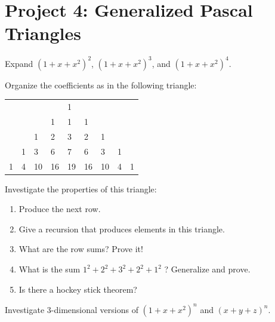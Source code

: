 \documentclass[10pt,]{book}
\theoremstyle{plain}
\theoremstyle{definition}
\theoremstyle{definition}
\theoremstyle{definition}
\theoremstyle{definition}
\numberwithin{equation}{chapter}
\begin{document}
\section[{Project 4: Generalized Pascal Triangles}]{Project 4: Generalized Pascal Triangles}\label{exercises-14}
\begin{divisionexercise}{1}\hypertarget{exercise-148}{}
\hypertarget{p-1204}{}%
Expand \({\left( 1 + x + x^{2} \right)}^{2}\), \(\left( 1 + x + x^{2} \right)^{3}\), and \(\left( 1 + x + x^{2} \right)^{4}\).%
\end{divisionexercise}%
\begin{divisionexercise}{2}\hypertarget{exercise-149}{}
\hypertarget{p-1205}{}%
Organize the coefficients as in the following triangle:%
\begin{sidebyside}{1}{0.1}{0.1}{0}
\begin{sbspanel}{0.8}
{\centering%
\begin{tabular}{lllllllll}
&&&&1&&&&\tabularnewline[0pt]
&&&1&1&1&&&\tabularnewline[0pt]
&&1&2&3&2&1&&\tabularnewline[0pt]
&1&3&6&7&6&3&1&\tabularnewline[0pt]
1&4&10&16&19&16&10&4&1
\end{tabular}
\par}
\end{sbspanel}
\end{sidebyside}
\end{divisionexercise}%
\begin{divisionexercise}{3}\hypertarget{exercise-150}{}
\hypertarget{p-1206}{}%
Investigate the properties of this triangle: \leavevmode%
\begin{enumerate}[label=(\alph*)]
\item\hypertarget{li-260}{}\hypertarget{p-1207}{}%
Produce the next row.%
\item\hypertarget{li-261}{}\hypertarget{p-1208}{}%
Give a recursion that produces elements in this triangle.%
\item\hypertarget{li-262}{}\hypertarget{p-1209}{}%
What are the row sums? Prove it!%
\item\hypertarget{li-263}{}\hypertarget{p-1210}{}%
What is the sum \(1^{2} + 2^{2} + 3^{2} + 2^{2} + 1^{2}\) ? Generalize and prove.%
\item\hypertarget{li-264}{}\hypertarget{p-1211}{}%
Is there a hockey stick theorem?%
\end{enumerate}
%
\end{divisionexercise}%
\begin{divisionexercise}{4}\hypertarget{exercise-151}{}
\hypertarget{p-1212}{}%
Investigate 3-dimensional versions of \(\left( 1 + x + x^{2} \right)^{n}\) and \(\left( x + y + z \right)^{n}.\)%
\end{divisionexercise}%
\end{document}
